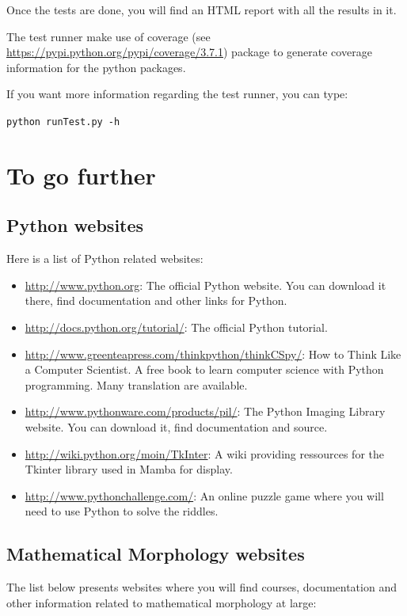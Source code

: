 \documentclass[a4paper,10pt,oneside]{article}
\begin{document}
Once the tests are done, you will find an HTML report with all the results in it.

The test runner make use of coverage (see \url{https://pypi.python.org/pypi/coverage/3.7.1})
package to generate coverage information for the python packages.

If you want more information regarding the test runner, you can type:

\texttt{python runTest.py -h}

\pagebreak

\appendix

\section{To go further}
\label{cha:to_go_further}
\subsection{Python websites}

Here is a list of Python related websites:

\begin{itemize}
\item \url{http://www.python.org}: The official Python website. You can download
it there, find documentation and other links for Python.
\item \url{http://docs.python.org/tutorial/}: The official Python tutorial.
\item \url{http://www.greenteapress.com/thinkpython/thinkCSpy/}: How to Think 
Like a Computer Scientist. A free book to learn computer science with Python
programming. Many translation are available.
\item \url{http://www.pythonware.com/products/pil/}: The Python Imaging Library
website. You can download it, find documentation and source.
\item \url{http://wiki.python.org/moin/TkInter}: A wiki providing ressources
for the Tkinter library used in Mamba for display.
\item \url{http://www.pythonchallenge.com/}: An online puzzle game where you
will need to use Python to solve the riddles.
\end{itemize}

\subsection{Mathematical Morphology websites}

The list below presents websites where you will find courses, documentation and
other information related to mathematical morphology at large:
\end{document}
